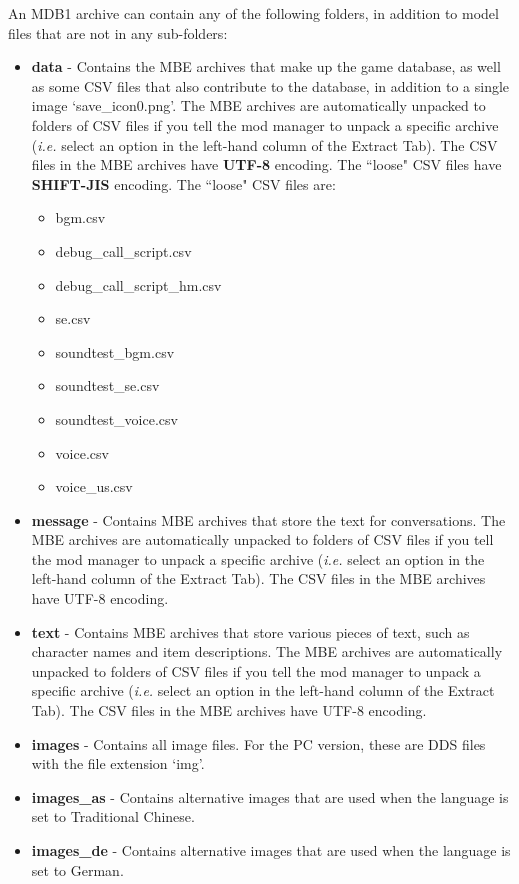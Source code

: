 \documentclass{article}
\begin{document}
An MDB1 archive can contain any of the following folders, in addition to model files that are not in any sub-folders:
\begin{itemize}
\item \textbf{data} - Contains the MBE archives that make up the game database, as well as some CSV files that also contribute to the database, in addition to a single image `save\_icon0.png'. The MBE archives are automatically unpacked to folders of CSV files if you tell the mod manager to unpack a specific archive (\textit{i.e.} select an option in the left-hand column of the Extract Tab). The CSV files in the MBE archives have \textbf{UTF-8} encoding. The ``loose" CSV files have \textbf{SHIFT-JIS} encoding. The ``loose" CSV files are:
\begin{itemize}
\item bgm.csv
\item debug\_call\_script.csv
\item debug\_call\_script\_hm.csv
\item se.csv
\item soundtest\_bgm.csv
\item soundtest\_se.csv
\item soundtest\_voice.csv
\item voice.csv
\item voice\_us.csv
\end{itemize}
\item \textbf{message} - Contains MBE archives that store the text for conversations. The MBE archives are automatically unpacked to folders of CSV files if you tell the mod manager to unpack a specific archive (\textit{i.e.} select an option in the left-hand column of the Extract Tab). The CSV files in the MBE archives have UTF-8 encoding.
\item \textbf{text} - Contains MBE archives that store various pieces of text, such as character names and item descriptions. The MBE archives are automatically unpacked to folders of CSV files if you tell the mod manager to unpack a specific archive (\textit{i.e.} select an option in the left-hand column of the Extract Tab). The CSV files in the MBE archives have UTF-8 encoding.
\item \textbf{images} - Contains all image files. For the PC version, these are DDS files with the file extension `img'.
\item \textbf{images\_as} - Contains alternative images that are used when the language is set to Traditional Chinese.
\item \textbf{images\_de} - Contains alternative images that are used when the language is set to German.

\end{itemize}
\end{document}
